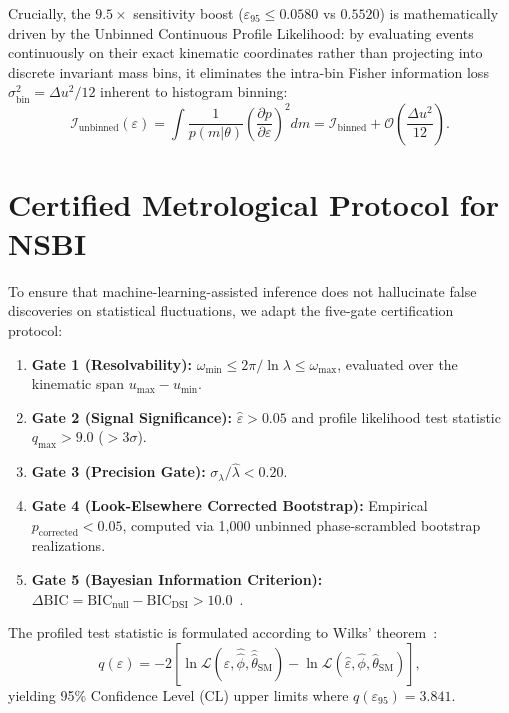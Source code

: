 \documentclass[11pt,a4paper]{article}
\begin{document}
Crucially, the $9.5\times$ sensitivity boost ($\varepsilon_{95} \le 0.0580$ vs $0.5520$) is mathematically driven by the Unbinned Continuous Profile Likelihood: by evaluating events continuously on their exact kinematic coordinates rather than projecting into discrete invariant mass bins, it eliminates the intra-bin Fisher information loss $\sigma_{\text{bin}}^2 = \Delta u^2 / 12$ inherent to histogram binning:
\begin{equation}
\mathcal{I}_{\text{unbinned}}(\varepsilon) = \int \frac{1}{p(m|\theta)} \left( \frac{\partial p}{\partial \varepsilon} \right)^2 dm = \mathcal{I}_{\text{binned}} + \mathcal{O}\left( \frac{\Delta u^2}{12} \right).
\end{equation}

\section{Certified Metrological Protocol for NSBI}
To ensure that machine-learning-assisted inference does not hallucinate false discoveries on statistical fluctuations, we adapt the five-gate certification protocol:
\begin{enumerate}
    \item \textbf{Gate 1 (Resolvability):} $\omega_{\min} \le 2\pi/\ln\lambda \le \omega_{\max}$, evaluated over the kinematic span $u_{\max} - u_{\min}$.
    \item \textbf{Gate 2 (Signal Significance):} $\hat{\varepsilon} > 0.05$ and profile likelihood test statistic $q_{\max} > 9.0$ ($> 3\sigma$).
    \item \textbf{Gate 3 (Precision Gate):} $\sigma_\lambda / \hat{\lambda} < 0.20$.
    \item \textbf{Gate 4 (Look-Elsewhere Corrected Bootstrap):} Empirical $p_{\text{corrected}} < 0.05$, computed via 1,000 unbinned phase-scrambled bootstrap realizations.
    \item \textbf{Gate 5 (Bayesian Information Criterion):} $\Delta\text{BIC} = \text{BIC}_{\text{null}} - \text{BIC}_{\text{DSI}} > 10.0$~\cite{olivaes2026planck}.
\end{enumerate}

The profiled test statistic is formulated according to Wilks' theorem~\cite{wilks1938}:
\begin{equation}
q(\varepsilon) = -2 \left[ \ln \mathcal{L}(\varepsilon, \hat{\hat{\phi}}, \hat{\hat{\theta}}_{\text{SM}}) - \ln \mathcal{L}(\hat{\varepsilon}, \hat{\phi}, \hat{\theta}_{\text{SM}}) \right],
\end{equation}
yielding 95\% Confidence Level (CL) upper limits where $q(\varepsilon_{95}) = 3.841$.
\end{document}

